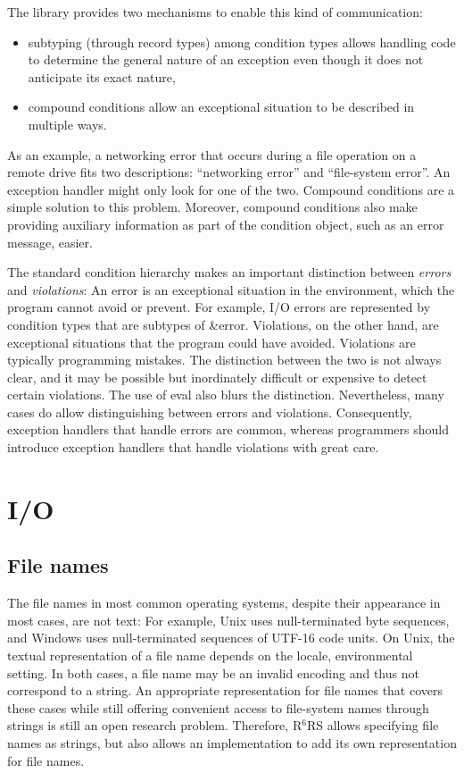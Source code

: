 \documentclass[twoside,twocolumn]{algol60}
\newcommand{\rn}[1]{R$^{#1}$RS}
\begin{document}
The  library provides two mechanisms to
enable this kind of communication:
%
\begin{itemize}
\item subtyping (through record types) among condition types allows
  handling code to determine the general nature of an exception even
  though it does not anticipate its exact nature,
\item compound conditions allow an exceptional situation to be
  described in multiple ways.
\end{itemize}
%
As an example, a networking error that occurs during a file operation
on a remote drive fits two descriptions: ``networking error'' and
``file-system error''.  An exception handler might only look for one of
the two.  Compound conditions are a simple solution to this problem.
Moreover, compound conditions also make providing auxiliary
information as part of the condition object, such as an error message,
easier.

The standard condition hierarchy makes an important distinction
between \emph{errors} and \emph{violations}: An error is an
exceptional situation in the environment, which the program cannot
avoid or prevent.  For example, I/O errors are represented by
condition types that are subtypes of {\cf\&error}.  Violations, on the
other hand, are exceptional situations that the program could have
avoided.  Violations are typically programming mistakes.  The
distinction between the two is not always clear, and it may be possible
but inordinately difficult or expensive to detect certain violations.
The use of {\cf eval} also blurs the distinction.  Nevertheless, many
cases do allow distinguishing between errors and violations.
Consequently, exception handlers that handle errors are common,
whereas programmers should introduce exception handlers that handle
violations with great care.


\chapter{I/O}

\section{File names}
\label{filenamesection}

The file names in most common operating systems, despite their
appearance in most cases, are not text: For example, Unix uses
null-terminated byte sequences, and Windows uses null-terminated
sequences of UTF-16 code units.  On Unix, the textual representation
of a file name depends on the locale, environmental setting.  In both
cases, a file name may be an invalid encoding and thus not correspond
to a string.  An appropriate representation for file names that covers
these cases while still offering convenient access to file-system
names through strings is still an open research problem.  Therefore,
\rn{6} allows specifying file names as strings, but also allows an
implementation to add its own representation for file names.
\end{document}
